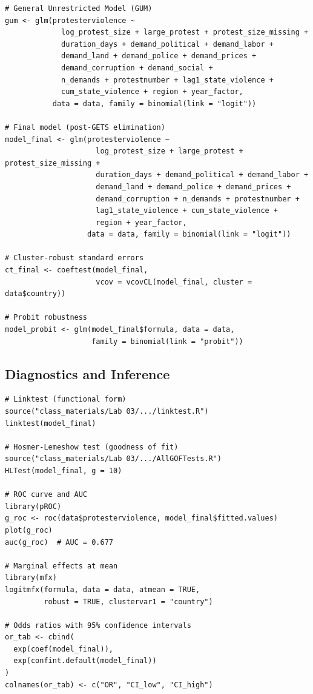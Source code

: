 \documentclass[11pt,a4paper]{article}
\begin{document}
\begin{verbatim}
# General Unrestricted Model (GUM)
gum <- glm(protesterviolence ~ 
             log_protest_size + large_protest + protest_size_missing +
             duration_days + demand_political + demand_labor + 
             demand_land + demand_police + demand_prices + 
             demand_corruption + demand_social +
             n_demands + protestnumber + lag1_state_violence + 
             cum_state_violence + region + year_factor,
           data = data, family = binomial(link = "logit"))

# Final model (post-GETS elimination)
model_final <- glm(protesterviolence ~ 
                     log_protest_size + large_protest + protest_size_missing +
                     duration_days + demand_political + demand_labor + 
                     demand_land + demand_police + demand_prices + 
                     demand_corruption + n_demands + protestnumber + 
                     lag1_state_violence + cum_state_violence + 
                     region + year_factor,
                   data = data, family = binomial(link = "logit"))

# Cluster-robust standard errors
ct_final <- coeftest(model_final, 
                     vcov = vcovCL(model_final, cluster = data$country))

# Probit robustness
model_probit <- glm(model_final$formula, data = data, 
                    family = binomial(link = "probit"))
\end{verbatim}

\subsection{Diagnostics and Inference}

\begin{verbatim}
# Linktest (functional form)
source("class_materials/Lab 03/.../linktest.R")
linktest(model_final)

# Hosmer-Lemeshow test (goodness of fit)
source("class_materials/Lab 03/.../AllGOFTests.R")
HLTest(model_final, g = 10)

# ROC curve and AUC
library(pROC)
g_roc <- roc(data$protesterviolence, model_final$fitted.values)
plot(g_roc)
auc(g_roc)  # AUC = 0.677

# Marginal effects at mean
library(mfx)
logitmfx(formula, data = data, atmean = TRUE, 
         robust = TRUE, clustervar1 = "country")

# Odds ratios with 95% confidence intervals
or_tab <- cbind(
  exp(coef(model_final)),
  exp(confint.default(model_final))
)
colnames(or_tab) <- c("OR", "CI_low", "CI_high")
\end{verbatim}
\end{document}
